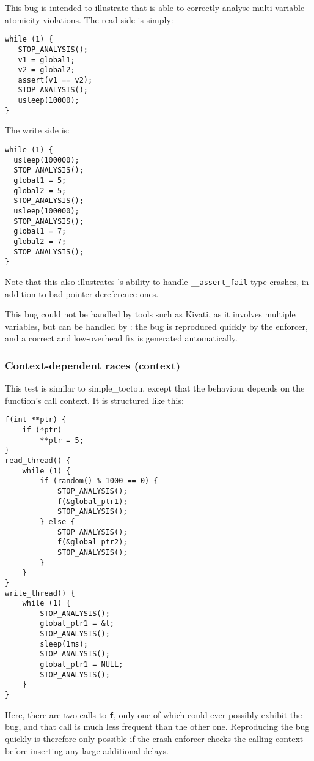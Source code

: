 This bug is intended to illustrate that {\technique} is able to
correctly analyse multi-variable atomicity violations.  The read side
is simply:

\begin{verbatim}
while (1) {
   STOP_ANALYSIS();
   v1 = global1;
   v2 = global2;
   assert(v1 == v2);
   STOP_ANALYSIS();
   usleep(10000);
}
\end{verbatim}

The write side is:

\begin{verbatim}
while (1) {
  usleep(100000);
  STOP_ANALYSIS();
  global1 = 5;
  global2 = 5;
  STOP_ANALYSIS();
  usleep(100000);
  STOP_ANALYSIS();
  global1 = 7;
  global2 = 7;
  STOP_ANALYSIS();
}
\end{verbatim}

Note that this also illustrates {\technique}'s ability to handle
\verb|__assert_fail|-type crashes, in addition to bad pointer
dereference ones.

This bug could not be handled by tools such as Kivati\needCite{}, as
it involves multiple variables, but can be handled by {\technique}:
the bug is reproduced quickly by the enforcer, and a correct and
low-overhead fix is generated automatically.

\subsubsection{Context-dependent races (context)}

This test is similar to simple\_toctou, except that the behaviour
depends on the function's call context.  It is structured like this:

\begin{verbatim}
f(int **ptr) {
    if (*ptr)
        **ptr = 5;   
}
read_thread() {
    while (1) {
        if (random() % 1000 == 0) {
            STOP_ANALYSIS();
            f(&global_ptr1);
            STOP_ANALYSIS();
        } else {
            STOP_ANALYSIS();
            f(&global_ptr2);
            STOP_ANALYSIS();
        }
    }
}        
write_thread() {
    while (1) {
        STOP_ANALYSIS();
        global_ptr1 = &t;
        STOP_ANALYSIS();
        sleep(1ms);
        STOP_ANALYSIS();
        global_ptr1 = NULL;
        STOP_ANALYSIS();
    }
}
\end{verbatim}

Here, there are two calls to \verb|f|, only one of which could ever
possibly exhibit the bug, and that call is much less frequent than the
other one.  Reproducing the bug quickly is therefore only possible if
the crash enforcer checks the calling context before inserting any
large additional delays.

